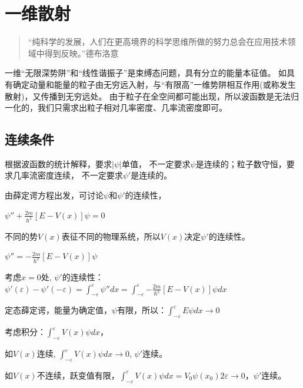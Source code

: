 \section{一维散射}


\begin{quotation}
``纯科学的发展，人们在更高境界的科学思维所做的努力总会在应用技术领域中得到反映。''\qquad 德布洛意
\end{quotation}

一维``无限深势阱''和``线性谐振子''是束缚态问题，具有分立的能量本征值。
如具有确定动量和能量的粒子由无穷远入射，与``有限高''一维势阱相互作用(或称发生散射)，又传播到无穷远处。
由于粒子在全空间都可能出现，所以波函数是无法归一化的，我们只需求出粒子相对几率密度、几率流密度即可。

\subsection{连续条件}

根据波函数的统计解释，要求$\left| \psi  \right|$单值，
不一定要求$\psi $是连续的；粒子数守恒，要求几率流密度连续，
不一定要求$\psi '$是连续的。

由薛定谔方程出发，可讨论$\psi$和$\psi '$的连续性，


\begin{center}
$\psi '' + \frac{{2m}}{{\hbar ^2 }}\left[ {E - V(x)} \right]\psi  = 0$
\end{center}

不同的势$V(x)$表征不同的物理系统，所以$V(x)$决定$\psi '$的连续性。

\begin{center}
$\psi '' =  - \frac{{2m}}{{\hbar ^2 }}\left[ {E - V(x)} \right]\psi $
\end{center}

考虑$x = 0$处, $\psi'$的连续性：$\psi '(\varepsilon ) - \psi '( - \varepsilon ) = \int_{ - \varepsilon }^\varepsilon  {\psi ''dx}  = \int_{ - \varepsilon }^\varepsilon  { - \frac{{2m}}{{\hbar ^2 }}\left[ {E - V(x)} \right]\psi dx} $

定态薛定谔，能量为确定值，$\psi$有限，所以：$\int_{ - \varepsilon }^\varepsilon  {E\psi dx \to 0} $

考虑积分：$\int_{ - \varepsilon }^\varepsilon  {V(x)\psi dx} $，

如$V(x)$连续, $\int_{ - \varepsilon }^\varepsilon  {V(x)\psi dx}
\to 0$, $\psi '$连续。

如$V(x)$不连续，跃变值有限，$\int_{ - \varepsilon }^\varepsilon  {V(x)\psi dx}  = V_0 \psi (x_0 )2\varepsilon  \to 0$，$\psi '$连续。

